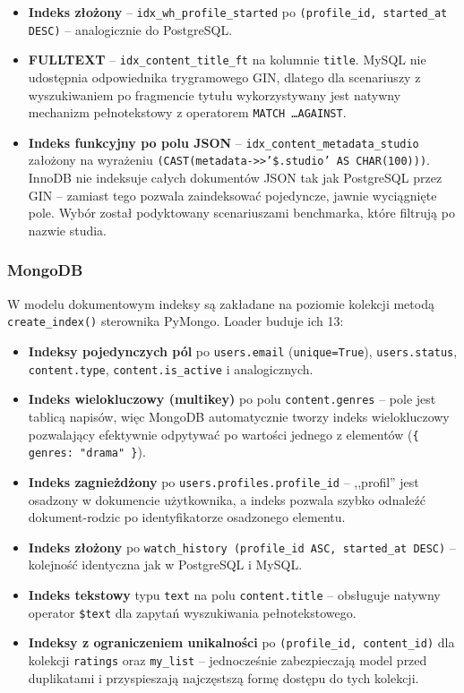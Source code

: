 \begin{itemize}
    \item \textbf{Indeks złożony} --
    \texttt{idx\_wh\_profile\_started} po
    \texttt{(profile\_id, started\_at DESC)} -- analogicznie
    do PostgreSQL.
    \item \textbf{FULLTEXT} -- \texttt{idx\_content\_title\_ft}
    na kolumnie \texttt{title}. MySQL nie udostępnia
    odpowiednika trygramowego GIN, dlatego dla scenariuszy
    z wyszukiwaniem po fragmencie tytułu wykorzystywany jest
    natywny mechanizm pełnotekstowy z operatorem
    \texttt{MATCH \dots AGAINST}.
    \item \textbf{Indeks funkcyjny po polu JSON} --
    \texttt{idx\_content\_metadata\_studio} założony na
    wyrażeniu \texttt{(CAST(metadata->>'\$.studio' AS CHAR(100)))}.
    InnoDB nie indeksuje całych dokumentów JSON tak jak
    PostgreSQL przez GIN -- zamiast tego pozwala zaindeksować
    pojedyncze, jawnie wyciągnięte pole. Wybór został
    podyktowany scenariuszami benchmarka, które filtrują po
    nazwie studia.
\end{itemize}

\subsubsection*{MongoDB}

W modelu dokumentowym indeksy są zakładane na poziomie
kolekcji metodą \texttt{create\_index()} sterownika PyMongo.
Loader buduje ich 13:

\begin{itemize}
    \item \textbf{Indeksy pojedynczych pól} po
    \texttt{users.email} (\texttt{unique=True}),
    \texttt{users.status}, \texttt{content.type},
    \texttt{content.is\_active} i analogicznych.
    \item \textbf{Indeks wielokluczowy (multikey)} po polu
    \texttt{content.genres} -- pole jest tablicą napisów,
    więc MongoDB automatycznie tworzy indeks wielokluczowy
    pozwalający efektywnie odpytywać po wartości jednego
    z elementów (\texttt{\{ genres: "drama" \}}).
    \item \textbf{Indeks zagnieżdżony} po
    \texttt{users.profiles.profile\_id} -- ,,profil''
    jest osadzony w dokumencie użytkownika, a indeks
    pozwala szybko odnaleźć dokument-rodzic po identyfikatorze
    osadzonego elementu.
    \item \textbf{Indeks złożony} po
    \texttt{watch\_history (profile\_id ASC, started\_at DESC)}
    -- kolejność identyczna jak w PostgreSQL i MySQL.
    \item \textbf{Indeks tekstowy} typu \texttt{text} na
    polu \texttt{content.title} -- obsługuje natywny operator
    \texttt{\$text} dla zapytań wyszukiwania pełnotekstowego.
    \item \textbf{Indeksy z ograniczeniem unikalności} po
    \texttt{(profile\_id, content\_id)} dla kolekcji
    \texttt{ratings} oraz \texttt{my\_list} -- jednocześnie
    zabezpieczają model przed duplikatami i przyspieszają
    najczęstszą formę dostępu do tych kolekcji.
\end{itemize}


